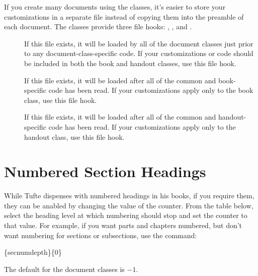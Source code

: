 If you create many documents using the \TL classes, it's easier to
store your customizations in a separate file instead of copying them into the
preamble of each document.  The \TL classes provide three file hooks:
, , and
.\sloppy

\begin{description}
  \item[]
    If this file exists, it will be loaded by all of the \TL document
    classes just prior to any document-class-specific code.  If your
    customizations or code should be included in both the book and handout
    classes, use this file hook.
  \item[] 
    If this file exists, it will be loaded after all of the common and
    book-specific code has been read.  If your customizations apply only to the
    book class, use this file hook.
  \item[] 
    If this file exists, it will be loaded after all of the common and
    handout-specific code has been read.  If your customizations apply only to
    the handout class, use this file hook.
\end{description}


\section{Numbered Section Headings}
\label{sec:numbered-sections}

While Tufte dispenses with numbered headings in his books, if you require them,
they can be anabled by changing the value of the 
counter.  From the table below, select the heading level at which numbering
should stop and set the  counter to that value.  For
example, if you want parts and chapters numbered, but don't want numbering for
sections or subsections, use the command:
\begin{docspec}
  \{secnumdepth\}\{0\}
\end{docspec}

The default  for the \TL document classes is $-1$.

